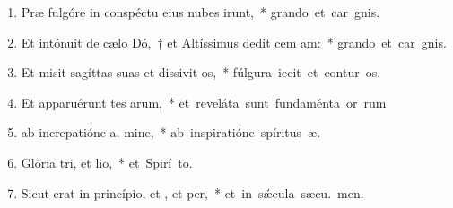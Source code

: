 \begin{flushleft}
\begin{enumerate}[leftmargin=*]
\item Præ fulgóre in conspéctu eius nubes irunt,~* \mbox{grando et car gnis.}

\item Et intónuit de cælo Dó,~† et Altíssimus dedit cem am:~* \mbox{grando et car gnis.}

\item Et misit sagíttas suas et dissivit os,~* \mbox{fúlgura iecit et contur os.}

\item Et apparuérunt tes arum,~* \mbox{et reveláta sunt fundaménta or rum}

\item ab increpatióne a, mine,~* \mbox{ab inspiratióne spíritus  æ.}

\item Glória tri, et lio,~* \mbox{et Spirí to.}

\item Sicut erat in princípio, et , et per,~* \mbox{et in s\'{\ae}cula sæcu. men.}



\end{enumerate}
\end{flushleft}


